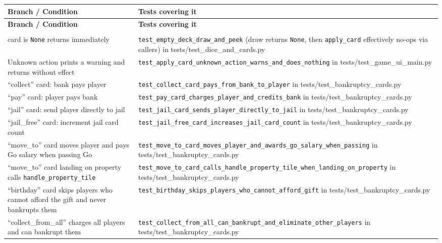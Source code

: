 \documentclass[11pt]{article}
\begin{document}
\begin{longtable}{>{\raggedright\arraybackslash}p{} >{\raggedright\arraybackslash}p{}}
\hline
\textbf{Branch / Condition} & \textbf{Tests covering it} \\ \hline
\endfirsthead
\hline
\textbf{Branch / Condition} & \textbf{Tests covering it} \\ \hline
\endhead
\multicolumn{2}{l}{\textbf{moneypoly.game: apply\_card and card handlers}} \\ \hline
card is \texttt{None} returns immediately & \texttt{test\_empty\_deck\_draw\_and\_peek} (draw returns \texttt{None}, then \texttt{apply\_card} effectively no-ops via callers) in tests/test\_dice\_and\_cards.py \\ \hline
Unknown action prints a warning and returns without effect & \texttt{test\_apply\_card\_unknown\_action\_warns\_and\_does\_nothing} in tests/test\_game\_ui\_main.py \\ \hline
``collect'' card: bank pays player & \texttt{test\_collect\_card\_pays\_from\_bank\_to\_player} in tests/test\_bankruptcy\_cards.py \\ \hline
``pay'' card: player pays bank & \texttt{test\_pay\_card\_charges\_player\_and\_credits\_bank} in tests/test\_bankruptcy\_cards.py \\ \hline
``jail'' card: send player directly to jail & \texttt{test\_jail\_card\_sends\_player\_directly\_to\_jail} in tests/test\_bankruptcy\_cards.py \\ \hline
``jail\_free'' card: increment jail card count & \texttt{test\_jail\_free\_card\_increases\_jail\_card\_count} in tests/test\_bankruptcy\_cards.py \\ \hline
``move\_to'' card moves player and pays Go salary when passing Go & \texttt{test\_move\_to\_card\_moves\_player\_and\_awards\_go\_salary\_when\_passing} in tests/test\_bankruptcy\_cards.py \\ \hline
``move\_to'' card landing on property calls \texttt{handle\_property\_tile} & \texttt{test\_move\_to\_card\_calls\_handle\_property\_tile\_when\_landing\_on\_property} in tests/test\_bankruptcy\_cards.py \\ \hline
``birthday'' card skips players who cannot afford the gift and never bankrupts them & \texttt{test\_birthday\_skips\_players\_who\_cannot\_afford\_gift} in tests/test\_bankruptcy\_cards.py \\ \hline
``collect\_from\_all'' charges all players and can bankrupt them & \texttt{test\_collect\_from\_all\_can\_bankrupt\_and\_eliminate\_other\_players} in tests/test\_bankruptcy\_cards.py \\ \hline


\end{longtable}
\end{document}
